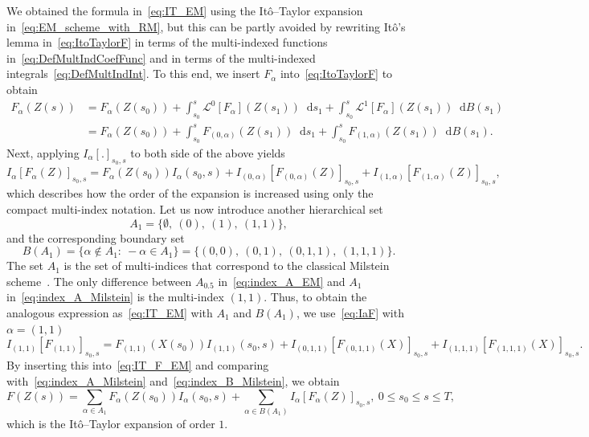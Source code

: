 \documentclass[11pt]{amsart}
\newcommand*\diff{\mathop{}\!\mathrm{d}}
\newcommand{\Lo}{\mathcal{L}^{0}}
\newcommand{\Li}{\mathcal{L}^{1}}
\begin{document}
{We obtained the formula in~\eqref{eq:IT_EM} using the Itô--Taylor expansion in~\eqref{eq:EM_scheme_with_RM}, but this can be partly avoided by rewriting Itô's lemma in~\eqref{eq:ItoTaylorF} in terms of the multi-indexed functions in~\eqref{eq:DefMultIndCoefFunc} and in terms of the multi-indexed integrals~\eqref{eq:DefMultIndInt}. To this end, we insert $F_{\alpha}$ into~\eqref{eq:ItoTaylorF} to obtain
\begin{align*}
F_{\alpha}(Z(s)) &= F_{\alpha}(Z(s_{0})) + \int_{s_{0}}^{s} \Lo[F_{\alpha}](Z(s_{1})) \diff s_{1} + \int_{s_{0}}^{s} \Li[F_{\alpha}](Z(s_{1})) \diff B(s_{1}) \\ &= F_{\alpha}(Z(s_{0})) + \int_{s_{0}}^{s} F_{(0,\alpha)}(Z(s_{1})) \diff s_{1} + \int_{s_{0}}^{s} F_{(1,\alpha)}(Z(s_{1})) \diff B(s_{1}).
\end{align*}
Next, applying $I_{\alpha}[.]_{s_{0},s}$ to both side of the above yields
\begin{equation}\label{eq:IaF}
I_{\alpha}[F_{\alpha}(Z)]_{s_{0},s} = F_{\alpha}(Z(s_{0})) I_{\alpha}(s_{0},s) + I_{(0,\alpha)}[F_{(0,\alpha)}(Z)]_{s_{0},s} + I_{(1,\alpha)}[F_{(1,\alpha)}(Z)]_{s_{0},s},
\end{equation}
which describes how the order of the expansion is increased using only the compact multi-index notation. Let us now introduce another hierarchical set
\begin{equation}\label{eq:index_A_Milstein}
A_{1} = \{ \emptyset,\ (0),\ (1),\ (1,1) \},
\end{equation}
and the corresponding boundary set
\begin{equation}\label{eq:index_B_Milstein}
B(A_{1}) = \{ \alpha \not\in A_{1}:\ -\alpha \in A_{1} \} = \{ (0,0),\ (0,1),\ (0,1,1),\ (1,1,1) \}.
\end{equation}
The set $A_{1}$ is the set of multi-indices that correspond to the classical Milstein scheme~\cite{MR356225}. The only difference between $A_{0.5}$ in~\eqref{eq:index_A_EM} and $A_{1}$ in~\eqref{eq:index_A_Milstein} is the multi-index $(1,1)$. Thus, to obtain the analogous expression as~\eqref{eq:IT_EM} with $A_{1}$ and $B(A_{1})$, we use~\eqref{eq:IaF} with $\alpha = (1,1)$
\begin{equation*}
I_{(1,1)}[F_{(1,1)}]_{s_{0},s} = F_{(1,1)}(X(s_{0})) I_{(1,1)}(s_{0},s) + I_{(0,1,1)} [F_{(0,1,1)}(X)]_{s_{0},s} + I_{(1,1,1)}[F_{(1,1,1)}(X)]_{s_{0},s}.
\end{equation*}
By inserting this into~\eqref{eq:IT_F_EM} and comparing with~\eqref{eq:index_A_Milstein} and~\eqref{eq:index_B_Milstein}, we obtain
\begin{equation}\label{eq:IT_Milstein}
F(Z(s)) = \sum_{\alpha \in A_{1}} F_{\alpha}(Z(s_{0})) I_{\alpha}(s_{0},s) + \sum_{\alpha \in B(A_{1})} I_{\alpha}[F_{\alpha}(Z)]_{s_{0},s},\ 0 \leq s_{0} \leq s \leq T,
\end{equation}
which is the Itô--Taylor expansion of order $1$. 

}
\end{document}
